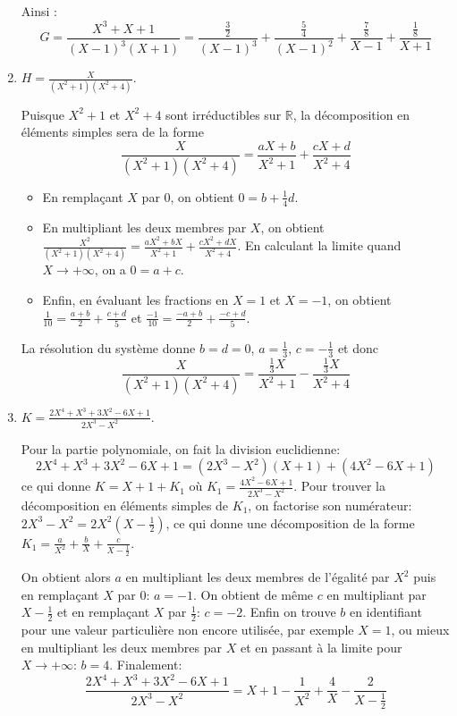 \documentclass[11pt,a4paper]{article}
\newcommand{\Rr}{\mathbb{R}} \newcommand{\R}{\mathbb{R}}
\begin{document}
\begin{enumerate}
Ainsi :
$$G = \frac{X^3+X+1}{(X-1)^3(X+1)} = \frac{\tfrac32}{(X-1)^3} + \frac{\tfrac54}{(X-1)^2} 
+ \frac{\tfrac78}{X-1}  + \frac{\tfrac18}{X+1}$$

\item $H=\frac{X}{(X^2+1)(X^2+4)}$.

Puisque $X^2+1$ et $X^2+4$ sont irréductibles sur $\Rr$, la décomposition en éléments simples sera de la forme 
$$\frac{X}{(X^2+1)(X^2+4)} = \frac{aX+b}{X^2+1} + \frac{cX+d}{X^2+4}$$

  \begin{itemize}
    \item En remplaçant $X$ par $0$, on obtient $0=b+\frac{1}{4}d$.
    \item En multipliant les deux membres par $X$, on obtient 
    $\frac{X^2}{(X^2+1)(X^2+4)} = \frac{aX^2+bX}{X^2+1} + \frac{cX^2+dX}{X^2+4}$.
    En calculant la limite quand $X\to +\infty$, on a $0=a+c$.
    \item Enfin, en évaluant les fractions en $X=1$ et $X=-1$, 
    on obtient $\frac{1}{10}=\frac{a+b}{2}+\frac{c+d}{5}$ et 
    $\frac{-1}{10}=\frac{-a+b}{2}+\frac{-c+d}{5}$.
  \end{itemize}

La résolution du système donne $b=d=0$, $a=\frac{1}{3}$, $c=-\frac{1}{3}$ et donc 
$$\frac{X}{(X^2+1)(X^2+4)} = \frac{\frac{1}{3}X}{X^2+1} - \frac{\frac{1}{3}X}{X^2+4}$$

\item $K=\frac{2X^4+X^3+3X^2-6X+1}{2X^3-X^2}$.

Pour la partie polynomiale, on fait la division euclidienne:
$$2X^4+X^3+3X^2-6X+1=(2X^3-X^2)(X+1)+(4X^2-6X+1)$$ 
ce qui donne 
$K=X+1+K_1$ où $K_1=\frac{4X^2-6X+1}{2X^3-X^2}$.
Pour trouver la décomposition en éléments simples de $K_1$, on factorise son numérateur: 
$2X^3-X^2=2X^2(X-\frac{1}{2})$, ce qui donne une décomposition de la forme
$K_1=\frac{a}{X^2}+\frac{b}{X}+\frac{c}{X-\frac{1}{2}}$.

On obtient alors $a$ en multipliant les deux membres de l'égalité par
$X^2$ puis en remplaçant $X$ par 0: $a=-1$. On obtient de
m\^eme $c$ en multipliant par $X-\frac{1}{2}$ et en remplaçant $X$
par $\frac{1}{2}$: $c=-2$. Enfin on trouve $b$ en identifiant pour une
valeur particuli\`ere non encore utilisée, par exemple $X=1$, ou mieux en
multipliant les deux membres par $X$ et en passant \`a la limite pour
$X\to+\infty$: $b=4$. Finalement:
$$\frac{2X^4+X^3+3X^2-6X+1}{2X^3-X^2}=X+1-\frac{1}{X^2}+\frac{4}{X}-\frac{2}{X-\frac{1}{2}}$$
\end{enumerate}
\end{document}
